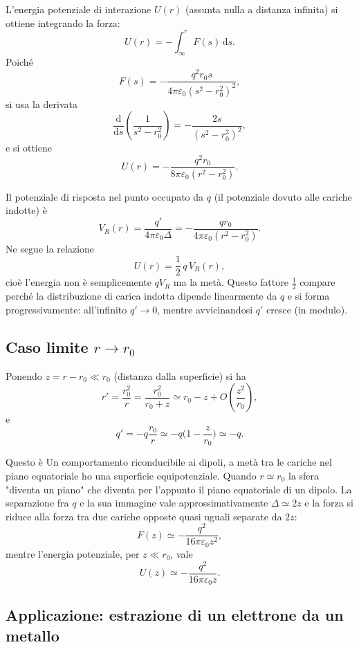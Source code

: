 \documentclass{book}
\begin{document}
L'energia potenziale di interazione $U(r)$ (assunta nulla a distanza infinita) si ottiene integrando la forza:
\[
U(r) = -\int_{\infty}^{r} F(s)\,\mathrm{d}s.
\]
Poiché
\[
F(s) = -\frac{q^{2}r_{0}s}{4\pi\varepsilon_{0}(s^{2}-r_0^{2})^{2}},
\]
si usa la derivata
\[
\frac{\mathrm{d}}{\mathrm{d}s}\!\left(\frac{1}{s^{2}-r_0^{2}}\right) = -\frac{2s}{(s^{2}-r_0^{2})^{2}},
\]
e si ottiene
\[
U(r) = -\frac{q^{2}r_{0}}{8\pi\varepsilon_{0}(r^{2}-r_{0}^{2})}.
\]

Il potenziale di risposta nel punto occupato da $q$ (il potenziale dovuto alle cariche indotte) è
\[
V_{R}(r)=\frac{q'}{4\pi\varepsilon_0\Delta} = -\frac{q r_0}{4\pi\varepsilon_0 (r^{2}-r_0^{2})}.
\]
Ne segue la relazione
\[
U(r) = \frac{1}{2}\, q\,V_{R}(r),
\]
cioè l'energia non è semplicemente $qV_R$ ma la metà. Questo fattore $\tfrac12$ compare perché la distribuzione di carica indotta dipende linearmente da $q$ e si forma progressivamente: all'infinito $q'\to 0$, mentre avvicinandosi $q'$ cresce (in modulo). 
\subsection{Caso limite $r \to r_0$}

Ponendo $z=r-r_0\ll r_0$ (distanza dalla superficie) si ha
\[
r'=\frac{r_0^{2}}{r}=\frac{r_0^{2}}{r_0+z}\simeq r_0 - z + O\!\left(\frac{z^{2}}{r_0}\right),
\]
e
\[
q'=-q\frac{r_0}{r}\simeq -q\Big(1-\frac{z}{r_0}\Big)\simeq -q.
\]

Questo è Un comportamento riconducibile ai dipoli, a metà tra le cariche nel piano equatoriale ho una superficie equipotenziale. Quando $r\simeq r_0$ la sfera "diventa un piano" che diventa per l'appunto il piano equatoriale di un dipolo.
La separazione fra $q$ e la sua immagine vale approssimativamente $\Delta\simeq 2z$ e la forza si riduce alla forza tra due cariche opposte quasi uguali separate da $2z$:
\[
F(z)\simeq -\frac{q^{2}}{16\pi\varepsilon_0 z^{2}},
\]
mentre l'energia potenziale, per $z\ll r_0$, vale
\[
U(z)\simeq -\frac{q^{2}}{16\pi\varepsilon_0 z}.
\]

\subsection{Applicazione: estrazione di un elettrone da un metallo}
\end{document}
